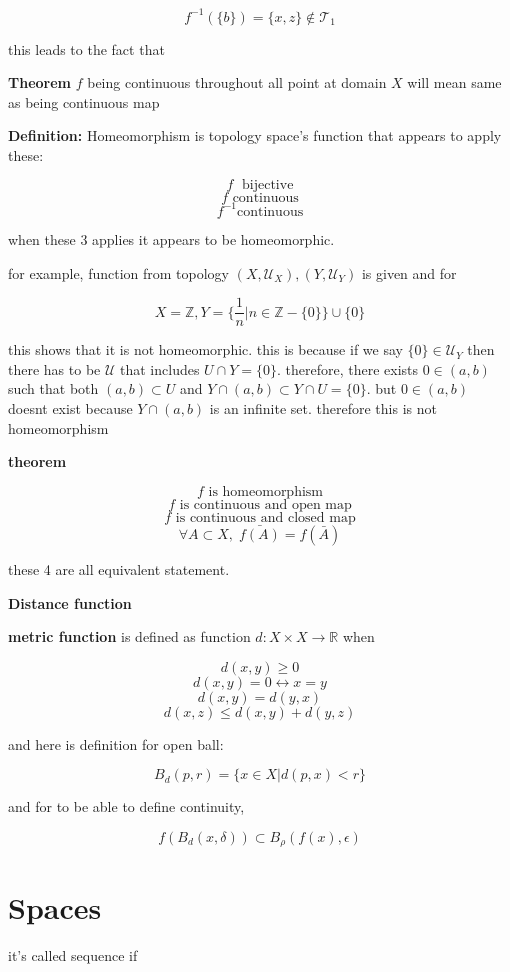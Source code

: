 \documentclass{article}
\begin{document}
\[
f^{-1}(\{b\})=\{x,z\}\notin \mathcal{T}_1
\]

this leads to the fact that

\textbf{Theorem} $f$ being continuous throughout all point at domain $X$ will mean same as being continuous map

\textbf{Definition:} Homeomorphism is topology space's function that appears to apply these:

\[
f \; \text{ bijective}
\]
\[
f \text{ continuous}
\]
\[
f^{-1} \text{continuous}
\]

when these 3 applies it appears to be homeomorphic.

for example, function from topology $(X,\mathcal{U}_X) , (Y,\mathcal{U}_Y)$ is given and for

\[
X=\mathbb{Z}, Y=\{\frac{1}{n}|n\in \mathbb{Z}-\{0\}\}\cup\{0\}
\]

this shows that it is not homeomorphic. this is because if we say $\{0\}\in \mathcal{U}_Y$ then there has to be $\mathcal{U}$ that includes $U\cap Y=\{0\}$. therefore, there exists $0\in (a,b)$ such that both $(a,b)\subset U$ and $Y\cap (a,b)\subset Y\cap U=\{0\}$. but $0\in (a,b)$ doesnt exist because $Y\cap (a,b)$ is an infinite set. therefore this is not homeomorphism

\textbf{theorem}

\[
f \text{ is homeomorphism}
\]
\[
f \text{ is continuous and open map}
\]
\[
f \text{ is continuous and closed map}
\]
\[
\forall A\subset X, \; \bar{f(A)}=f(\bar{A})
\]

these 4 are all equivalent statement.


\textbf{Distance function}

\textbf{metric function } is defined as function $d:X \times X \rightarrow \mathbb{R}$ when

\[
d(x,y)\geq 0
\]
\[
d(x,y)=0 \longleftrightarrow x=y
\]
\[
d(x,y)=d(y,x)
\]
\[
d(x,z)\leq d(x,y)+d(y,z)
\]

and here is definition for open ball:

\[
B_d(p,r)=\{x\in X| d(p,x)<r\}
\]

and for to be able to define continuity,

\[
f(B_d(x,\delta))\subset B_\rho(f(x),\epsilon)
\]

\section*{Spaces}

it's called sequence if 
\end{document}
